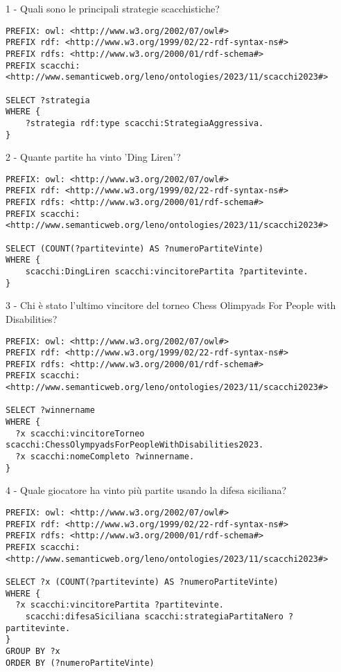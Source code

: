 \documentclass[12pt]{book}
\begin{document}
1 - Quali sono le principali strategie scacchistiche?

\begin{verbatim}
PREFIX: owl: <http://www.w3.org/2002/07/owl#>
PREFIX rdf: <http://www.w3.org/1999/02/22-rdf-syntax-ns#>
PREFIX rdfs: <http://www.w3.org/2000/01/rdf-schema#>
PREFIX scacchi: <http://www.semanticweb.org/leno/ontologies/2023/11/scacchi2023#>

SELECT ?strategia
WHERE {
    ?strategia rdf:type scacchi:StrategiaAggressiva.
}
\end{verbatim}

2 - Quante partite ha vinto 'Ding Liren'?

\begin{verbatim}
PREFIX: owl: <http://www.w3.org/2002/07/owl#>
PREFIX rdf: <http://www.w3.org/1999/02/22-rdf-syntax-ns#>
PREFIX rdfs: <http://www.w3.org/2000/01/rdf-schema#>
PREFIX scacchi: <http://www.semanticweb.org/leno/ontologies/2023/11/scacchi2023#>

SELECT (COUNT(?partitevinte) AS ?numeroPartiteVinte)
WHERE {
    scacchi:DingLiren scacchi:vincitorePartita ?partitevinte.
}
\end{verbatim}

3 - Chi è stato l'ultimo vincitore del torneo Chess Olimpyads For
People with Disabilities?

\begin{verbatim}
PREFIX: owl: <http://www.w3.org/2002/07/owl#>
PREFIX rdf: <http://www.w3.org/1999/02/22-rdf-syntax-ns#>
PREFIX rdfs: <http://www.w3.org/2000/01/rdf-schema#>
PREFIX scacchi: <http://www.semanticweb.org/leno/ontologies/2023/11/scacchi2023#>

SELECT ?winnername
WHERE {
  ?x scacchi:vincitoreTorneo scacchi:ChessOlympyadsForPeopleWithDisabilities2023.
  ?x scacchi:nomeCompleto ?winnername.
}
\end{verbatim}

4 - Quale giocatore ha vinto più partite usando la difesa siciliana?

\begin{verbatim}
PREFIX: owl: <http://www.w3.org/2002/07/owl#>
PREFIX rdf: <http://www.w3.org/1999/02/22-rdf-syntax-ns#>
PREFIX rdfs: <http://www.w3.org/2000/01/rdf-schema#>
PREFIX scacchi: <http://www.semanticweb.org/leno/ontologies/2023/11/scacchi2023#>

SELECT ?x (COUNT(?partitevinte) AS ?numeroPartiteVinte)
WHERE {
  ?x scacchi:vincitorePartita ?partitevinte.
    scacchi:difesaSiciliana scacchi:strategiaPartitaNero ?partitevinte.
}
GROUP BY ?x
ORDER BY (?numeroPartiteVinte)
\end{verbatim}
\end{document}
